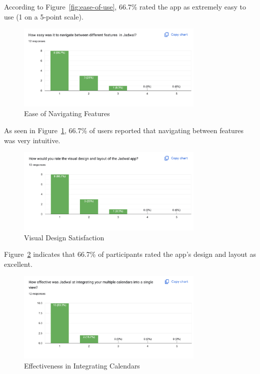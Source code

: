 According to Figure~\ref{fig:ease-of-use}, 66.7\% rated the app as extremely easy to use (1 on a 5-point scale).

\begin{figure}[H]
\centering
\includegraphics[width=0.8\textwidth]{images/end-survey/04-ease-of-feature-navigation.png}
\caption{Ease of Navigating Features}
\label{fig:ease-of-feature-navigation}
\end{figure}

As seen in Figure~\ref{fig:ease-of-feature-navigation}, 66.7\% of users reported that navigating between features was very intuitive.

\begin{figure}[H]
\centering
\includegraphics[width=0.8\textwidth]{images/end-survey/05-visual-design-rate.png}
\caption{Visual Design Satisfaction}
\label{fig:visual-design-rate}
\end{figure}

Figure~\ref{fig:visual-design-rate} indicates that 66.7\% of participants rated the app’s design and layout as excellent.

\begin{figure}[H]
\centering
\includegraphics[width=0.8\textwidth]{images/end-survey/06-jadwal-effectiveness-integrating-multiple-calendars.png}
\caption{Effectiveness in Integrating Calendars}
\label{fig:jadwal-effectiveness-integrating-multiple-calendars}
\end{figure}

